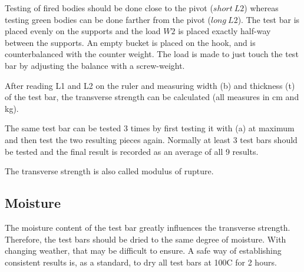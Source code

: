 Testing of fired bodies should be done close to the pivot ($short~L2$) whereas 
testing green bodies can be done farther from the pivot ($long~L2$). The test 
bar is placed evenly on the supports and the load $W2$ is placed exactly 
half-way between the supports. An empty bucket is placed on the hook, and is 
counterbalanced with the counter weight. The load is made to just touch the 
test bar by adjusting the balance with a screw-weight.

After reading L1 and L2 on the ruler and measuring width (b) and thickness (t) 
of the test bar, the transverse strength can be calculated (all measures in cm 
and kg).

The same test bar can be tested 3 times by first testing it with (a) at maximum 
and then test the two resulting pieces again. Normally at least 3 test bars 
should be tested and the final result is recorded as an average of all 9 
results.

The transverse strength is also called modulus of rupture.
\subsection{Moisture}
The moisture content of the test bar greatly influences the transverse 
strength. Therefore, the test bars should be dried to the same degree of 
moisture. With changing weather, that may be difficult to ensure. A safe way of 
establishing consistent results is, as a standard, to dry all test bars at 
100\degree C for 2 hours.
